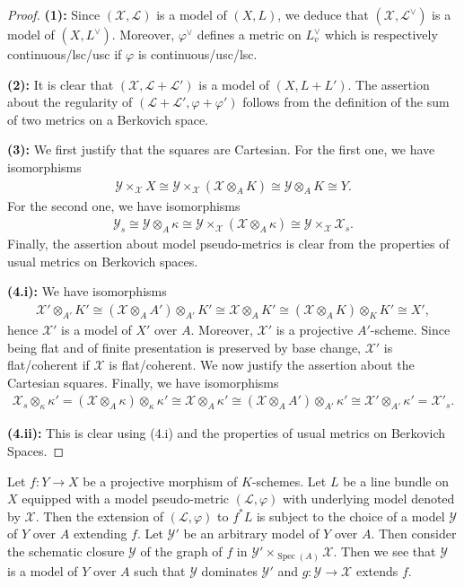 \documentclass [11pt,reqno]{amsart}
\newcommand{\1}{\mathmybb{1}}
\def\cL{{\mathcal{L}}}
\def\cX{{\mathcal{X}}}
\def\cY{{\mathcal{Y}}}
\def\Spec{\operatorname{Spec}}
\begin{document}
\begin{proof}
\textbf{(1):} Since $(\cX,\cL)$ is a model of $(X,L)$, we deduce that $(\cX,\cL^{\vee})$ is a model of $(X,L^{\vee})$. Moreover, $
\varphi^{\vee}$ defines a metric on $L^{\vee}_{v}$ which is respectively continuous/lsc/usc if $\varphi$ is continuous/usc/lsc.

\textbf{(2):} It is clear that $(\cX,\cL +\cL')$ is a model of $(X,L+L')$. The assertion about the regularity of $(\cL+ \cL',\varphi + \varphi')$ follows from the definition of the sum of two metrics on a Berkovich space.

\textbf{(3):} We first justify that the squares are Cartesian. For the first one, we have isomorphisms
\begin{align*}
\cY \times_{\cX} X \cong \cY \times_{\cX} (\cX \otimes_{A} K) \cong \cY \otimes_{A} K \cong Y.
\end{align*}
For the second one, we have isomorphisms
\begin{align*}
\cY_s \cong \cY \otimes_{A} \kappa \cong \cY \times_{\cX} (\cX \otimes_{A} \kappa) \cong \cY\times_{\cX} \cX_s.
\end{align*}
Finally, the assertion about model pseudo-metrics is clear from the properties of usual metrics on Berkovich spaces.

\textbf{(4.i):} We have isomorphisms 
\begin{align*}
\cX' \otimes_{A'} K' \cong (\cX \otimes_{A} A') \otimes_{A'} K' \cong \cX \otimes_{A} K' \cong (\cX \otimes_{A} K) \otimes_{K} K' \cong X',
\end{align*}
hence $\cX'$ is a model of $X'$ over $A$. Moreover, $\cX'$ is a projective $A'$-scheme. Since being flat and of finite presentation is preserved by base change, $\cX'$ is flat/coherent if $\cX$ is flat/coherent. We now justify the assertion about the Cartesian squares. Finally, we have isomorphisms 
\begin{align*}
\cX_s \otimes_{\kappa} \kappa' = (\cX \otimes_{A} \kappa) \otimes_{\kappa} \kappa' \cong \cX \otimes_{A} \kappa' \cong (\cX \otimes_{A} A') \otimes_{A'} \kappa' \cong \cX' \otimes_{A'} \kappa' = \cX'_s.
\end{align*}

\textbf{(4.ii):} This is clear using (4.i) and the properties of usual metrics on Berkovich Spaces.
\end{proof}

\begin{remark}
\label{remark:models_extension}
Let $f : Y \to X$ be a projective morphism of $K$-schemes. Let $L$ be a line bundle on $X$ equipped with a model pseudo-metric $(\cL,\varphi)$ with underlying model denoted by $\cX$. Then the extension of $(\cL,\varphi)$ to $f^{\ast}L$ is subject to the choice of a model $\cY$ of $Y$ over $A$ extending $f$. Let $\cY'$ be an arbitrary model of $Y$ over $A$. Then consider the schematic closure $\cY$ of the graph of $f$ in $\cY' \times_{\Spec(A)} \cX$. Then we see that $\cY$ is a model of $Y$ over $A$ such that $\cY$ dominates $\cY'$ and $g:\cY \to \cX$ extends $f$. %
\end{remark}
\end{document}
